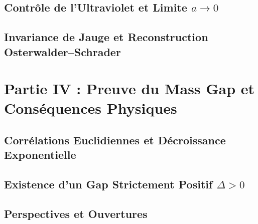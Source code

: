 \documentclass[12pt,a4paper]{book}
\theoremstyle{remark}
\theoremstyle{definition}
\theoremstyle{plain}
\begin{document}
	\chapter{Contrôle de l’Ultraviolet et Limite \texorpdfstring{$a\to 0$}{a -> 0}}
	\label{chap:7}
	
	
	\chapter{Invariance de Jauge et Reconstruction Osterwalder--Schrader}
	\label{chap:8}
	
	
	\part*{Partie IV : Preuve du Mass Gap et Conséquences Physiques}
	
	\chapter{Corrélations Euclidiennes et Décroissance Exponentielle}
	\label{chap:9}
	
	
	\chapter{Existence d’un Gap Strictement Positif \texorpdfstring{$\Delta>0$}{Delta>0}}
	\label{chap:10}
	
	
	\chapter{Perspectives et Ouvertures}
	\label{chap:11}
	
	
\end{document}
